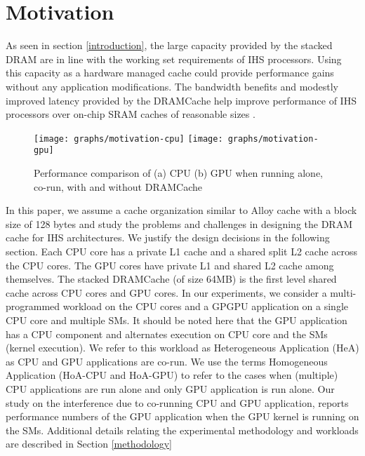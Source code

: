 \section{Motivation} \label{motivation}
As seen in section \ref{introduction}, the large capacity provided by the stacked DRAM are in line with the working set requirements of IHS processors. Using this capacity as a hardware managed cache could provide performance gains without any application modifications. The bandwidth benefits and modestly improved latency provided by the DRAMCache help improve performance of IHS processors over on-chip SRAM caches of reasonable sizes \cite{amd-exascale1}. 
\begin{figure}[htbp]
   \texttt{[image: graphs/motivation-cpu]}
   \texttt{[image: graphs/motivation-gpu]}
   \caption{Performance comparison of (a) CPU (b) GPU when running alone, co-run, with and without DRAMCache}
   \label{fig:motivation}
\end{figure}
\par In this paper, we assume a cache organization similar to Alloy cache \cite{alloy} with a block size of 128 bytes and study the problems and challenges in designing the DRAM cache for IHS architectures. We justify the design decisions in the following section. 
Each CPU core has a private L1 cache and a shared split L2 cache across the CPU cores. The GPU cores have private L1 and shared L2 cache among themselves.  
The stacked DRAMCache (of size 64MB) is the first level shared cache across CPU cores and GPU cores. In our experiments, we consider a multi-programmed workload on the CPU cores and a GPGPU application on a single CPU core and multiple SMs. It should be noted here that the GPU application has a CPU component and alternates execution on CPU core and the SMs (kernel execution). We refer to this workload as Heterogeneous Application (HeA) as CPU and GPU applications are co-run. We use the terms Homogeneous Application (HoA-CPU and HoA-GPU) to refer to the cases when (multiple) CPU applications are run alone and only GPU application is run alone.  Our study on the interference due to co-running CPU and GPU application, reports performance numbers of the GPU application when the GPU kernel is running on the SMs.  
Additional details relating the experimental methodology and workloads are described in Section \ref{methodology}


